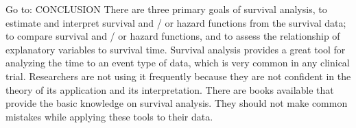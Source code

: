Go to:
CONCLUSION
There are three primary goals of survival analysis, to estimate and interpret survival and / or hazard functions from the survival data; to compare survival and / or hazard functions, and to assess the relationship of explanatory variables to survival time. Survival analysis provides a great tool for analyzing the time to an event type of data, which is very common in any clinical trial. Researchers are not using it frequently because they are not confident in the theory of its application and its interpretation. There are books available that provide the basic knowledge on survival analysis. They should not make common mistakes while applying these tools to their data.
